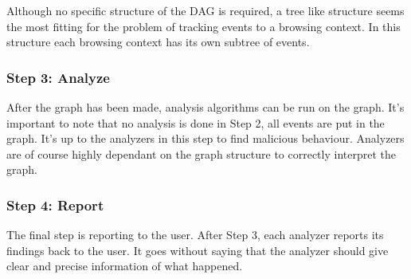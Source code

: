 Although no specific structure of the DAG is required, a tree like structure seems the most fitting for the problem of tracking events to a browsing context. In this structure each browsing context has its own subtree of events. 



\subsubsection{Step 3: Analyze}

After the graph has been made, analysis algorithms can be run on the graph. It's important to note that no analysis is done in Step 2, all events are put in the graph. It's up to the analyzers in this step to find malicious behaviour. Analyzers are of course highly dependant on the graph structure to correctly interpret the graph.\\


\subsubsection{Step 4: Report}

The final step is reporting to the user. After Step 3, each analyzer reports its findings back to the user. It goes without saying that the analyzer should give clear and precise information of what happened.
